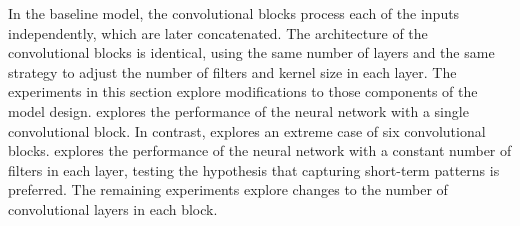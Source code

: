 
In the baseline model, the convolutional blocks process each
of the inputs independently, which are later concatenated.
The architecture of the convolutional blocks is identical,
using the same number of layers and the same strategy to
adjust the number of filters and kernel size in each layer.
The experiments in this section explore modifications to
those components of the model design.
 explores the
performance of the neural network with a single
convolutional block. In contrast,
 explores
an extreme case of six convolutional blocks.
 explores the
performance of the neural network with a constant number of
filters in each layer, testing the hypothesis that capturing
short-term patterns is preferred. The remaining experiments
explore changes to the number of convolutional layers in
each block. 
